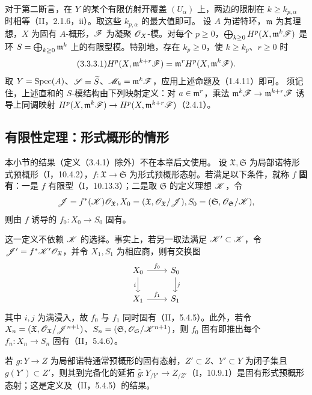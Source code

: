 对于第二断言，在 $Y$ 的某个有限仿射开覆盖 $(U_\alpha)$ 上，两边的限制在 $k\ge k_{p,\alpha}$ 时相等（II，2.1.6，ii）。取这些 $k_{p,\alpha}$ 的最大值即可。\finishproof
{}
设 $A$ 为诺特环，$\mathfrak m$ 为其理想，$X$ 为固有 $A$-概形，$\mathscr F$ 为凝聚 $\mathscr O_X$-模。对每个 $p\ge0$，$\bigoplus_{k\ge0}H^p(X,\mathfrak m^k\mathscr F)$ 是环 $S=\bigoplus_{k\ge0}\mathfrak m^k$ 上的有限型模。特别地，存在 $k_p\ge0$，使 $k\ge k_p$、$r\ge0$ 时
\begin{equation}\tag{3.3.3.1}
H^p(X,\mm^{k+r}\F)=\mm^rH^p(X,\mm^k\F).
\end{equation}
\eproof
取 $Y=\operatorname{Spec}(A)$、$\mathscr S=\widetilde{S}$、$\mathscr M_k=\mathfrak m^k\mathscr F$，应用上述命题及（1.4.11）即可。
须记住，上述直和的 $S$-模结构由下列映射定义：对 $a\in\mathfrak m^r$，乘法 $\mathfrak m^k\mathscr F\to\mathfrak m^{k+r}\mathscr F$ 诱导上同调映射 $H^p(X,\mathfrak m^k\mathscr F)\to H^p(X,\mathfrak m^{k+r}\mathscr F)$（2.4.1）。\finishproof

\subsection{有限性定理：形式概形的情形}
本小节的结果（定义（3.4.1）除外）不在本章后文使用。
设 $\mathfrak X,\mathfrak S$ 为局部诺特形式预概形（I，10.4.2），$f:\mathfrak X\to\mathfrak S$ 为形式预概形态射。若满足以下条件，就称 $f$ \textbf{固有}：一是 $f$ 有限型（I，10.13.3）；二是取 $\mathfrak S$ 的定义理想 $\mathscr K$，令
\[
\mathscr J=f^*(\mathscr K)\mathscr O_{\mathfrak X},
X_0=(\mathfrak X,\mathscr O_{\mathfrak X}/\mathscr J),
S_0=(\mathfrak S,\mathscr O_{\mathfrak S}/\mathscr K),
\]
则由 $f$ 诱导的 $f_0:X_0\to S_0$ 固有。

这一定义不依赖 $\mathscr K$ 的选择。事实上，若另一取法满足 $\mathscr K'\subset\mathscr K$，令 $\mathscr J'=f^*\mathscr K'\mathscr O_{\mathfrak X}$，并令 $X_1,S_1$ 为相应商，则有交换图
\[
\begin{tikzcd}
X_0\arrow[r,"f_0"]\arrow[d,"i"']&S_0\arrow[d,"j"]\\
X_1\arrow[r,"f_1"]&S_1
\end{tikzcd}
\]
其中 $i,j$ 为满浸入，故 $f_0$ 与 $f_1$ 同时固有（II，5.4.5）。此外，若令 $X_n=(\mathfrak X,\mathscr O_{\mathfrak X}/\mathscr J^{n+1})$、$S_n=(\mathfrak S,\mathscr O_{\mathfrak S}/\mathscr K^{n+1})$，则 $f_0$ 固有即推出每个 $f_n:X_n\to S_n$ 固有（II，5.4.6）。

若 $g:Y\to Z$ 为局部诺特通常预概形的固有态射，$Z'\subset Z$、$Y'\subset Y$ 为闭子集且 $g(Y')\subset Z'$，则其到完备化的延拓 $\widehat g:Y_{/Y'}\to Z_{/Z'}$（I，10.9.1）是固有形式预概形态射；这是定义及（II，5.4.5）的结果。

